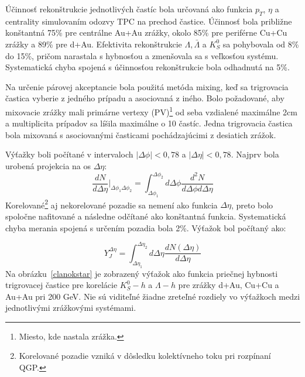 \documentclass[thesismargins, thesislinespacing]{rnthesis}
\begin{document}
Účinnosť rekonštrukcie jednotlivých častíc bola určovaná ako funkcia $p_T$, $\eta$ a centrality simulovaním odozvy TPC na prechod častice. Účinnosť bola približne konštantná 75\% pre centrálne Au+Au zrážky, okolo 85\% pre periférne Cu+Cu zrážky a 89\% pre d+Au. Efektivita rekonštrukcie $\Lambda, \bar{\Lambda}$ a $K^0_S$ sa pohybovala od 8\% do 15\%, pričom narastala s hybnosťou a zmenšovala sa s veľkosťou systému. Systematická chyba spojená s účinnosťou rekonštrukcie bola odhadnutá na 5\%.

Na určenie párovej akceptancie bola použitá metóda mixing, keď sa trigrovacia častica vyberie z jedného prípadu a asociovaná z iného. Bolo požadované, aby mixovacie zrážky mali primárne vertexy (PV)\footnote{Miesto, kde nastala zrážka.} od seba vzdialené maximálne 2cm a multiplicita prípadov sa líšila maximálne o 10 častíc. Jedna trigrovacia častica bola mixovaná s asociovanými časticami pochádzajúcimi z desiatich zrážok.

Výťažky boli počítané v intervaloch $|\Delta\phi|<0,78$ a $|\Delta\eta|<0,78$. Najprv bola urobená projekcia na os $\Delta\eta$:
\begin{equation}
\frac{dN}{d\Delta\eta}|_{\Delta\phi_1 \Delta\phi_2}= \int_{\Delta\phi_1}^{\Delta\phi_2}d\Delta\phi \frac{d^2N}{d\Delta \phi d\Delta \eta}
\end{equation}
Korelované\footnote{Korelované pozadie vzniká v dôsledku kolektívneho toku pri rozpínaní QGP.} aj nekorelované pozadie sa nemení ako funkcia $\Delta \eta$, preto bolo spoločne nafitované a následne odčítané ako konštantná funkcia. Systematická chyba merania spojená s určením pozadia bola 2\%. Výťažok bol počítaný ako:

\begin{equation}
Y^{\Delta\eta}_J=\int_{\Delta\eta_1}^{\Delta\eta_2}d\Delta\eta \frac{dN(\Delta\eta)}{d\Delta\eta}
\end{equation}
Na obrázku~\ref{clanokstar} je zobrazený výťažok ako funkcia priečnej hybnosti trigrovacej častice pre korelácie $K_S^0 - h$ a $\Lambda-h$ pre zrážky d+Au, Cu+Cu a Au+Au pri 200 GeV. Nie sú viditeľné žiadne zreteľné rozdiely vo výťažkoch medzi jednotlivými zrážkovými systémami. 
\end{document}

